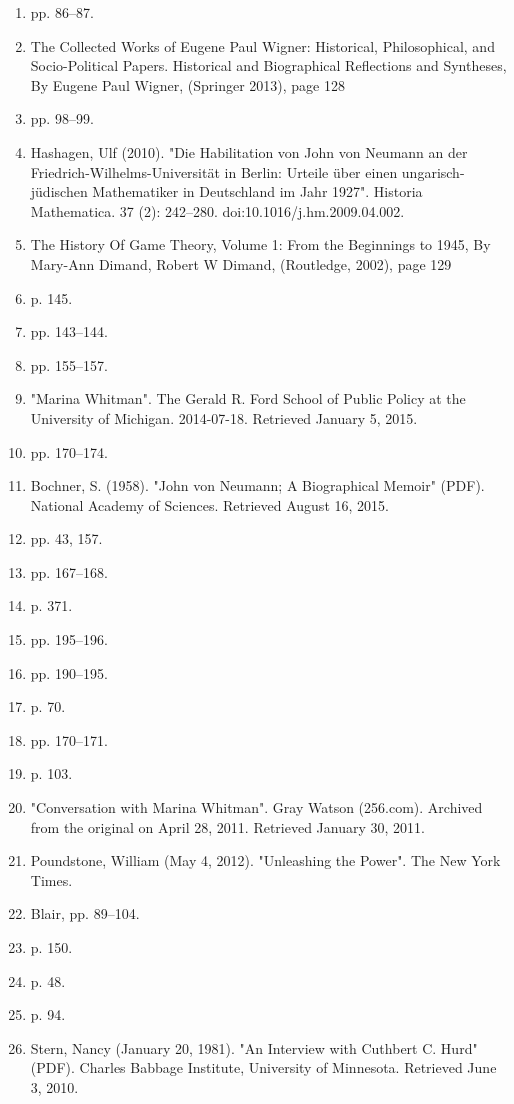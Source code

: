 \begin{enumerate}
\item  pp. 86–87.
\item The Collected Works of Eugene Paul Wigner: Historical, Philosophical, and Socio-Political Papers. Historical and Biographical Reflections and Syntheses, By Eugene Paul Wigner, (Springer 2013), page 128
\item  pp. 98–99.
\item Hashagen, Ulf (2010). "Die Habilitation von John von Neumann an der Friedrich-Wilhelms-Universität in Berlin: Urteile über einen ungarisch-jüdischen Mathematiker in Deutschland im Jahr 1927". Historia Mathematica. 37 (2): 242–280. doi:10.1016/j.hm.2009.04.002.
\item The History Of Game Theory, Volume 1: From the Beginnings to 1945, By Mary-Ann Dimand, Robert W Dimand, (Routledge, 2002), page 129
\item  p. 145.
\item  pp. 143–144.
\item  pp. 155–157.
\item "Marina Whitman". The Gerald R. Ford School of Public Policy at the University of Michigan. 2014-07-18. Retrieved January 5, 2015.
\item  pp. 170–174.
\item Bochner, S. (1958). "John von Neumann; A Biographical Memoir" (PDF). National Academy of Sciences. Retrieved August 16, 2015.
\item  pp. 43, 157.
\item  pp. 167–168.
\item  p. 371.
\item  pp. 195–196.
\item  pp. 190–195.
\item  p. 70.
\item  pp. 170–171.
\item  p. 103.
\item "Conversation with Marina Whitman". Gray Watson (256.com). Archived from the original on April 28, 2011. Retrieved January 30, 2011.
\item Poundstone, William (May 4, 2012). "Unleashing the Power". The New York Times.
\item Blair, pp. 89–104.
\item  p. 150.
\item  p. 48.
\item  p. 94.
\item Stern, Nancy (January 20, 1981). "An Interview with Cuthbert C. Hurd" (PDF). Charles Babbage Institute, University of Minnesota. Retrieved June 3, 2010.

\end{enumerate}
